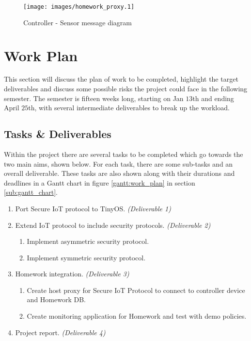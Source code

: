 \documentclass{mprop}
\begin{document}
\begin{figure}[h!]
\centering
\texttt{[image: images/homework\_proxy.1]}
\caption{Controller - Sensor message diagram}
\label{fig:sequence_diagram}
\end{figure}

\section{Work Plan}
This section will discuss the plan of work to be completed, highlight the target deliverables and discuss some possible risks the project could face in the following semester. The semester is fifteen weeks long, starting on Jan $13$th and ending April $25$th, with several intermediate deliverables to break up the workload.


\subsection{Tasks \& Deliverables} %
\label{sub:deliverables}
Within the project there are several tasks to be completed which go towards the two main aims, shown below. For each task, there are some sub-tasks and an overall deliverable. These tasks are also shown along with their durations and deadlines in a Gantt chart in figure \ref{gantt:work_plan} in section \ref{sub:gantt_chart}. 

{\small
\begin{enumerate}
  \item Port Secure IoT protocol to TinyOS. {\footnotesize\textit{(Deliverable 1)}}
  \item Extend IoT protocol to include security protocols. {\footnotesize\textit{(Deliverable 2)}}
  \begin{enumerate}
    \item Implement asymmetric security protocol.
    \item Implement symmetric security protocol.
  \end{enumerate}
  \item Homework integration. {\footnotesize\textit{(Deliverable 3)}}
  \begin{enumerate}
    \item Create host proxy for Secure IoT Protocol to connect to controller device and Homework DB.
    \item Create monitoring application for Homework and test with demo policies.
  \end{enumerate}
  \item Project report. {\footnotesize\textit{(Deliverable 4)}}
\end{enumerate}}
\end{document}
